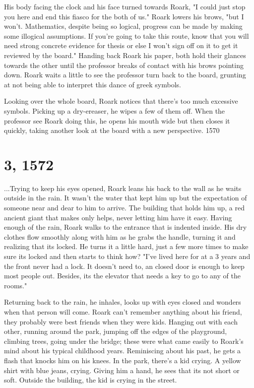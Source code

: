 		His body facing the clock and his face turned towards Roark, "I could just stop you here and end this fiasco for the both of us." 
	Roark lowers his brows, "but I won't. Mathematics, despite being so logical, progress can be made by making some illogical assumptions. If
	you're going to take this route, know that you will need strong concrete evidence for thesis or else I won't sign off on it to get it 
	reviewed by the board." Handing back Roark his paper, both hold their glances towards the other until the professor breaks of contact with
	his brows pointing down. Roark waits a little to see the professor turn back to the board, grunting at not being able to interpret this
	dance of greek symbols. 

		Looking over the whole board, Roark notices that there's too much excessive symbols. Picking up a dry-ereaser, he wipes a few of them
	off. When the professor see Roark doing this, he opens his mouth wide but then closes it quickly, taking another look at the board with a
	new perspective. {1570}

\section{3, 1572}

		...Trying to keep his eyes opened, Roark leans his back to the wall as he waits outside in the rain. It wasn't the water that kept him
	up but the expectation of someone near and dear to him to arrive. The building that holds him up, a red ancient giant that makes only helps,
	never letting him have it easy. Having enough of the rain, Roark walks to the entrance that is indented inside. His dry clothes flow smoothly
	along with him as he grabs the handle, turning it and realizing that its locked. He turns it a little hard, just a few more times to make sure
	its locked and then starts to think how? "I've lived here for at a 3 years and the front never had a lock. It doesn't need to, an closed door
	is enough to keep most people out. Besides, its the elevator that needs a key to go to any of the rooms."

		Returning back to the rain, he inhales, looks up with eyes closed and wonders when that person will come. Roark can't remember anything		about his friend, they probably were best friends when they were kids. Hanging out with each other, running around the park, jumping off 
	the edges of the playground, climbing trees, going under the bridge; these were what came easily to Roark's mind about his typical childhood
	years. Reminiscing about his past, he gets a flash that knocks him on his knees. In the park, there's a kid crying. A yellow shirt with blue
	jeans, crying. Giving him a hand, he sees that its not short or soft. Outside the building, the kid is crying in the street.

